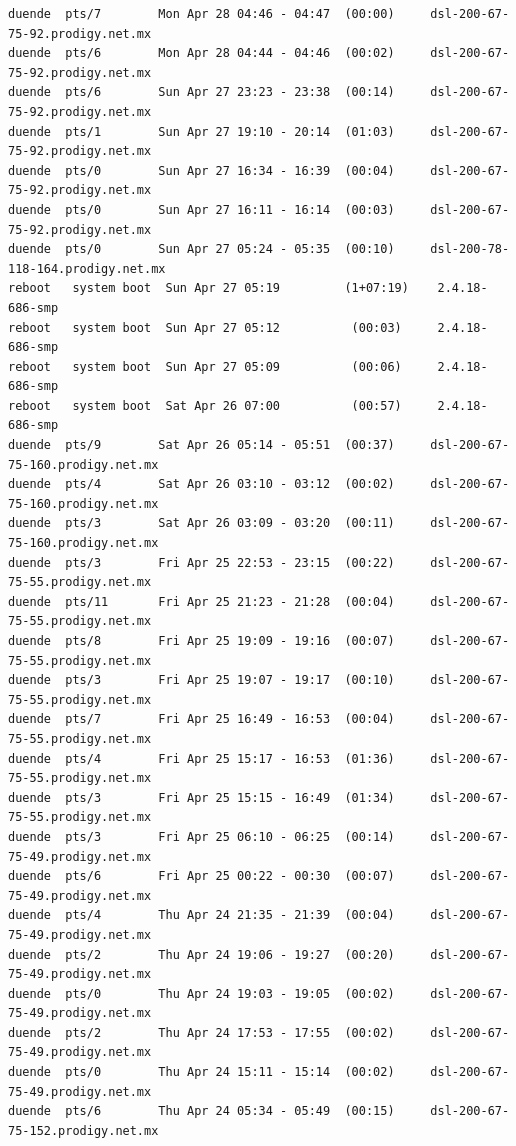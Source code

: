 \begin{lstlisting}[style=terminal]
duende  pts/7        Mon Apr 28 04:46 - 04:47  (00:00)     dsl-200-67-75-92.prodigy.net.mx
duende  pts/6        Mon Apr 28 04:44 - 04:46  (00:02)     dsl-200-67-75-92.prodigy.net.mx
duende  pts/6        Sun Apr 27 23:23 - 23:38  (00:14)     dsl-200-67-75-92.prodigy.net.mx
duende  pts/1        Sun Apr 27 19:10 - 20:14  (01:03)     dsl-200-67-75-92.prodigy.net.mx
duende  pts/0        Sun Apr 27 16:34 - 16:39  (00:04)     dsl-200-67-75-92.prodigy.net.mx
duende  pts/0        Sun Apr 27 16:11 - 16:14  (00:03)     dsl-200-67-75-92.prodigy.net.mx
duende  pts/0        Sun Apr 27 05:24 - 05:35  (00:10)     dsl-200-78-118-164.prodigy.net.mx
reboot   system boot  Sun Apr 27 05:19         (1+07:19)    2.4.18-686-smp
reboot   system boot  Sun Apr 27 05:12          (00:03)     2.4.18-686-smp
reboot   system boot  Sun Apr 27 05:09          (00:06)     2.4.18-686-smp
reboot   system boot  Sat Apr 26 07:00          (00:57)     2.4.18-686-smp
duende  pts/9        Sat Apr 26 05:14 - 05:51  (00:37)     dsl-200-67-75-160.prodigy.net.mx
duende  pts/4        Sat Apr 26 03:10 - 03:12  (00:02)     dsl-200-67-75-160.prodigy.net.mx
duende  pts/3        Sat Apr 26 03:09 - 03:20  (00:11)     dsl-200-67-75-160.prodigy.net.mx
duende  pts/3        Fri Apr 25 22:53 - 23:15  (00:22)     dsl-200-67-75-55.prodigy.net.mx
duende  pts/11       Fri Apr 25 21:23 - 21:28  (00:04)     dsl-200-67-75-55.prodigy.net.mx
duende  pts/8        Fri Apr 25 19:09 - 19:16  (00:07)     dsl-200-67-75-55.prodigy.net.mx
duende  pts/3        Fri Apr 25 19:07 - 19:17  (00:10)     dsl-200-67-75-55.prodigy.net.mx
duende  pts/7        Fri Apr 25 16:49 - 16:53  (00:04)     dsl-200-67-75-55.prodigy.net.mx
duende  pts/4        Fri Apr 25 15:17 - 16:53  (01:36)     dsl-200-67-75-55.prodigy.net.mx
duende  pts/3        Fri Apr 25 15:15 - 16:49  (01:34)     dsl-200-67-75-55.prodigy.net.mx
duende  pts/3        Fri Apr 25 06:10 - 06:25  (00:14)     dsl-200-67-75-49.prodigy.net.mx
duende  pts/6        Fri Apr 25 00:22 - 00:30  (00:07)     dsl-200-67-75-49.prodigy.net.mx
duende  pts/4        Thu Apr 24 21:35 - 21:39  (00:04)     dsl-200-67-75-49.prodigy.net.mx
duende  pts/2        Thu Apr 24 19:06 - 19:27  (00:20)     dsl-200-67-75-49.prodigy.net.mx
duende  pts/0        Thu Apr 24 19:03 - 19:05  (00:02)     dsl-200-67-75-49.prodigy.net.mx
duende  pts/2        Thu Apr 24 17:53 - 17:55  (00:02)     dsl-200-67-75-49.prodigy.net.mx
duende  pts/0        Thu Apr 24 15:11 - 15:14  (00:02)     dsl-200-67-75-49.prodigy.net.mx
duende  pts/6        Thu Apr 24 05:34 - 05:49  (00:15)     dsl-200-67-75-152.prodigy.net.mx

\end{lstlisting}
